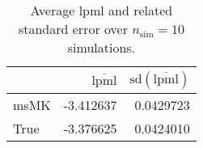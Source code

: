 \begin{table}[H]

\caption{Average lpml and related standard error over $n_{\text{sim}} = 10$ simulations.}
\centering
\begin{tabular}[t]{lrr}
\toprule
  & $\overbar{\text{lpml}}$ & $\text{sd}(\overbar{\text{lpml}})$\\
\midrule
msMK & -3.412637 & 0.0429723\\
True & -3.376625 & 0.0424010\\
\bottomrule
\end{tabular}
\end{table}